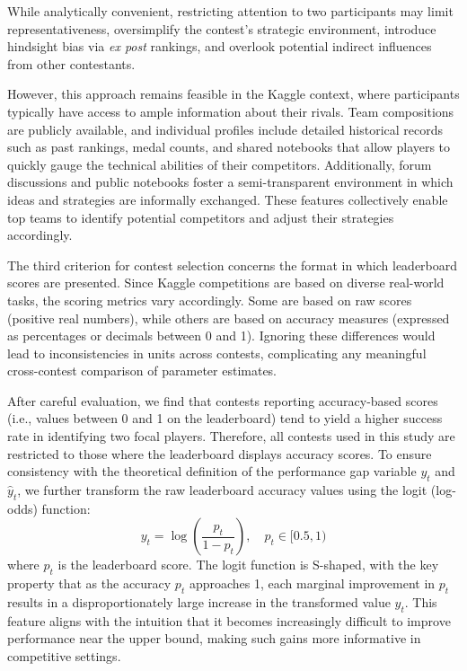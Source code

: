 \documentclass[mnsc]{informs3}
\begin{document}
While analytically convenient, restricting attention to two participants may limit representativeness, oversimplify the contest’s strategic environment, introduce hindsight bias via \textit{ex post} rankings, and overlook potential indirect influences from other contestants.

However, this approach remains feasible in the Kaggle context, where participants typically have access to ample information about their rivals. 
Team compositions are publicly available, and individual profiles include detailed historical records such as past rankings, medal counts, and shared notebooks that allow players to quickly gauge the technical abilities of their competitors. 
Additionally, forum discussions and public notebooks foster a semi-transparent environment in which ideas and strategies are informally exchanged. 
These features collectively enable top teams to identify potential competitors and adjust their strategies accordingly. 

The third criterion for contest selection concerns the format in which leaderboard scores are presented.
Since Kaggle competitions are based on diverse real-world tasks, the scoring metrics vary accordingly.
Some are based on raw scores (positive real numbers), while others are based on accuracy measures (expressed as percentages or decimals between 0 and 1).
Ignoring these differences would lead to inconsistencies in units across contests, complicating any meaningful cross-contest comparison of parameter estimates.

After careful evaluation, we find that contests reporting accuracy-based scores (i.e., values between 0 and 1 on the leaderboard) tend to yield a higher success rate in identifying two focal players.
Therefore, all contests used in this study are restricted to those where the leaderboard displays accuracy scores.
To ensure consistency with the theoretical definition of the performance gap variable $y_t$ and $\hat{y}_t$, we further transform the raw leaderboard accuracy values using the logit (log-odds) function: 
\begin{equation*}
y_t = \log\left(\frac{p_t}{1-p_t}\right), \quad p_t\in[0.5, 1)
\end{equation*}
where $p_t$ is the leaderboard score. 
The logit function is S-shaped, with the key property that as the accuracy $p_t$ approaches 1, each marginal improvement in $p_t$ results in a disproportionately large increase in the transformed value $y_t$. 
This feature aligns with the intuition that it becomes increasingly difficult to improve performance near the upper bound, making such gains more informative in competitive settings.
\end{document}
